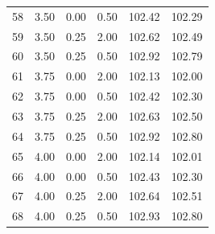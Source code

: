 \begin{tabular}{rrrrrr}
  58 & 3.50 & 0.00 & 0.50 & 102.42 & 102.29 \\ 
  59 & 3.50 & 0.25 & 2.00 & 102.62 & 102.49 \\ 
  60 & 3.50 & 0.25 & 0.50 & 102.92 & 102.79 \\ 
  61 & 3.75 & 0.00 & 2.00 & 102.13 & 102.00 \\ 
  62 & 3.75 & 0.00 & 0.50 & 102.42 & 102.30 \\ 
  63 & 3.75 & 0.25 & 2.00 & 102.63 & 102.50 \\ 
  64 & 3.75 & 0.25 & 0.50 & 102.92 & 102.80 \\ 
  65 & 4.00 & 0.00 & 2.00 & 102.14 & 102.01 \\ 
  66 & 4.00 & 0.00 & 0.50 & 102.43 & 102.30 \\ 
  67 & 4.00 & 0.25 & 2.00 & 102.64 & 102.51 \\ 
  68 & 4.00 & 0.25 & 0.50 & 102.93 & 102.80 \\ 
   \hline
\end{tabular}
